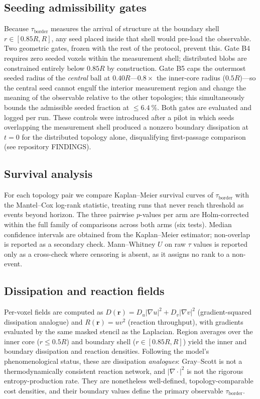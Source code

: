 \documentclass[aps,pre,preprint,superscriptaddress,nofootinbib,floatfix]{revtex4-2}
\newcommand{\tb}{\tau_{\mathrm{border}}}
\begin{document}
\subsection{Seeding admissibility gates}
\label{app:gates}

Because $\tb$ measures the arrival of structure at the boundary shell $r\in[0.85R,R]$, any seed placed inside that shell would pre-load the observable. Two geometric gates, frozen with the rest of the protocol, prevent this. Gate B4 requires zero seeded voxels within the measurement shell; distributed blobs are constrained entirely below $0.85R$ by construction. Gate B5 caps the outermost seeded radius of the \textit{central} ball at $0.40R$---$0.8\times$ the inner-core radius ($0.5R$)---so the central seed cannot engulf the interior measurement region and change the meaning of the observable relative to the other topologies; this simultaneously bounds the admissible seeded fraction at ${\le}\SI{6.4}{\percent}$. Both gates are evaluated and logged per run. These controls were introduced after a pilot in which seeds overlapping the measurement shell produced a nonzero boundary dissipation at $t=0$ for the distributed topology alone, disqualifying first-passage comparison (see repository FINDINGS).

\subsection{Survival analysis}

For each topology pair we compare Kaplan--Meier survival curves of $\tb$ with the Mantel--Cox log-rank statistic, treating runs that never reach threshold as events beyond horizon. The three pairwise $p$-values per arm are Holm-corrected within the full family of comparisons across both arms (six tests). Median confidence intervals are obtained from the Kaplan--Meier estimator; non-overlap is reported as a secondary check. Mann--Whitney $U$ on raw $\tau$ values is reported only as a cross-check where censoring is absent, as it assigns no rank to a non-event.

\subsection{Dissipation and reaction fields}

Per-voxel fields are computed as $D(\mathbf{r}) = D_u|\nabla u|^2 + D_v|\nabla v|^2$ (gradient-squared dissipation analogue) and $R(\mathbf{r}) = uv^2$ (reaction throughput), with gradients evaluated by the same masked stencil as the Laplacian. Region averages over the inner core ($r\le0.5R$) and boundary shell ($r\in[0.85R,R]$) yield the inner and boundary dissipation and reaction densities. Following the model's phenomenological status, these are dissipation \textit{analogues}: Gray--Scott is not a thermodynamically consistent reaction network, and $|\nabla\cdot|^2$ is not the rigorous entropy-production rate. They are nonetheless well-defined, topology-comparable cost densities, and their boundary values define the primary observable $\tb$.
\end{document}
